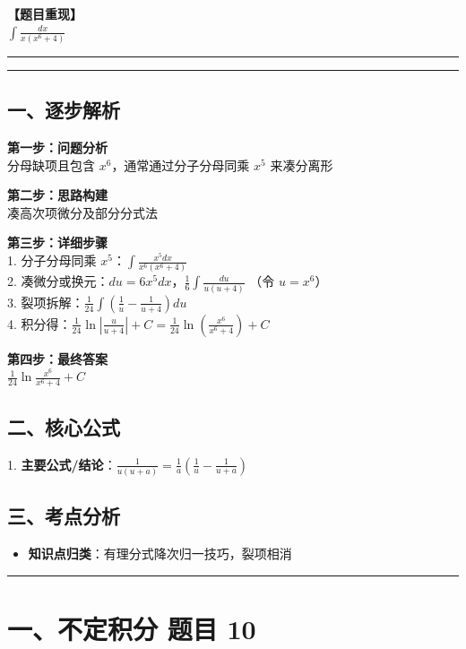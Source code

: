 ﻿\documentclass[12pt, a4paper]{ctexart}
\newcommand{\TopSeparator}{
    \par\noindent\rule{\textwidth}{1.5pt}\vspace{0.5em}
}
\newcommand{\AnalysisSeparator}{
    \par\noindent\rule{\textwidth}{0.5pt}\vspace{0.2em}\hrule\vspace{0.5em}
}
\newenvironment{RedAnalysis}{
    \par
    \color{red} 
}{
    \par
    \color{black} 
}
\begin{document}
\textbf{【题目重现】} \\
$\int \frac{dx}{x(x^6+4)}$

\AnalysisSeparator

\begin{RedAnalysis}

	\subsection*{一、逐步解析}

	\textbf{第一步：问题分析} \\
	分母缺项且包含 $x^6$，通常通过分子分母同乘 $x^5$ 来凑分离形

	\textbf{第二步：思路构建} \\
	凑高次项微分及部分分式法

	\textbf{第三步：详细步骤} \\
	1. 分子分母同乘 $x^5$：$\int \frac{x^5 dx}{x^6(x^6+4)}$ \\ 
	2. 凑微分或换元：$du = 6x^5dx$，$\frac{1}{6} \int \frac{du}{u(u+4)}$ （令 $u=x^6$） \\ 
	3. 裂项拆解：$\frac{1}{24} \int (\frac{1}{u} - \frac{1}{u+4}) du$ \\ 
	4. 积分得：$\frac{1}{24} \ln \left| \frac{u}{u+4} \right| + C = \frac{1}{24} \ln \left( \frac{x^6}{x^6+4} \right) + C$

	\textbf{第四步：最终答案} \\
	$\frac{1}{24} \ln \frac{x^6}{x^6+4} + C$

	\subsection*{二、核心公式}
	1. \textbf{主要公式/结论}：$\frac{1}{u(u+a)} = \frac{1}{a} \left(\frac{1}{u} - \frac{1}{u+a}\right)$

	\subsection*{三、考点分析}
	\begin{itemize}
		\item \textbf{知识点归类}：有理分式降次归一技巧，裂项相消
	\end{itemize}

\end{RedAnalysis}

\vspace{2em}

\TopSeparator
\section*{一、不定积分 题目 10}
\end{document}
